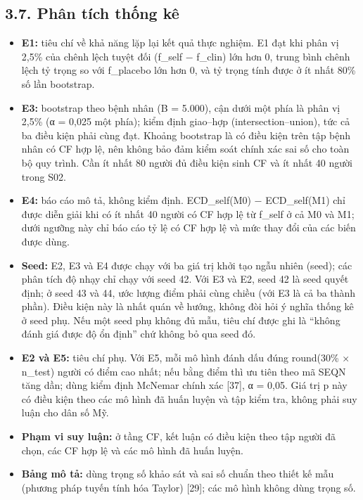 \documentclass[9pt,a4paper]{extarticle}
\providecommand{\tightlist}{\setlength{\itemsep}{0pt}\setlength{\parskip}{0pt}}
\begin{document}
\subsection{3.7. Phân tích thống kê}

\begin{itemize}
\tightlist
\item
  \textbf{E1:} tiêu chí về khả năng lặp lại kết quả thực nghiệm. E1 đạt
  khi phân vị 2,5\% của chênh lệch tuyệt đối (f\_self − f\_clin) lớn hơn
  0, trung bình chênh lệch tỷ trọng so với f\_placebo lớn hơn 0, và tỷ
  trọng tính được ở ít nhất 80\% số lần bootstrap.
\item
  \textbf{E3:} bootstrap theo bệnh nhân (B = 5.000), cận dưới một phía
  là phân vị 2,5\% (α = 0,025 một phía); kiểm định giao--hợp
  (intersection--union), tức cả ba điều kiện phải cùng đạt. Khoảng
  bootstrap là có điều kiện trên tập bệnh nhân có CF hợp lệ, nên không
  bảo đảm kiểm soát chính xác sai số cho toàn bộ quy trình. Cần ít nhất
  80 người đủ điều kiện sinh CF và ít nhất 40 người trong S02.
\item
  \textbf{E4:} báo cáo mô tả, không kiểm định. ECD\_self(M0) −
  ECD\_self(M1) chỉ được diễn giải khi có ít nhất 40 người có CF hợp lệ
  từ f\_self ở cả M0 và M1; dưới ngưỡng này chỉ báo cáo tỷ lệ có CF hợp
  lệ và mức thay đổi của các biến được dùng.
\item
  \textbf{Seed:} E2, E3 và E4 được chạy với ba giá trị khởi tạo ngẫu
  nhiên (seed); các phân tích độ nhạy chỉ chạy với seed 42. Với E3 và
  E2, seed 42 là seed quyết định; ở seed 43 và 44, ước lượng điểm phải
  cùng chiều (với E3 là cả ba thành phần). Điều kiện này là nhất quán về
  hướng, không đòi hỏi ý nghĩa thống kê ở seed phụ. Nếu một seed phụ
  không đủ mẫu, tiêu chí được ghi là ``không đánh giá được độ ổn định''
  chứ không bỏ qua seed đó.
\item
  \textbf{E2 và E5:} tiêu chí phụ. Với E5, mỗi mô hình đánh dấu đúng
  round(30\% × n\_test) người có điểm cao nhất; nếu bằng điểm thì ưu
  tiên theo mã SEQN tăng dần; dùng kiểm định McNemar chính xác {[}37{]},
  α = 0,05. Giá trị p này có điều kiện theo các mô hình đã huấn luyện và
  tập kiểm tra, không phải suy luận cho dân số Mỹ.
\item
  \textbf{Phạm vi suy luận:} ở tầng CF, kết luận có điều kiện theo tập
  người đã chọn, các CF hợp lệ và các mô hình đã huấn luyện.
\item
  \textbf{Bảng mô tả:} dùng trọng số khảo sát và sai số chuẩn theo thiết
  kế mẫu (phương pháp tuyến tính hóa Taylor) {[}29{]}; các mô hình không
  dùng trọng số.
\end{itemize}
\end{document}
